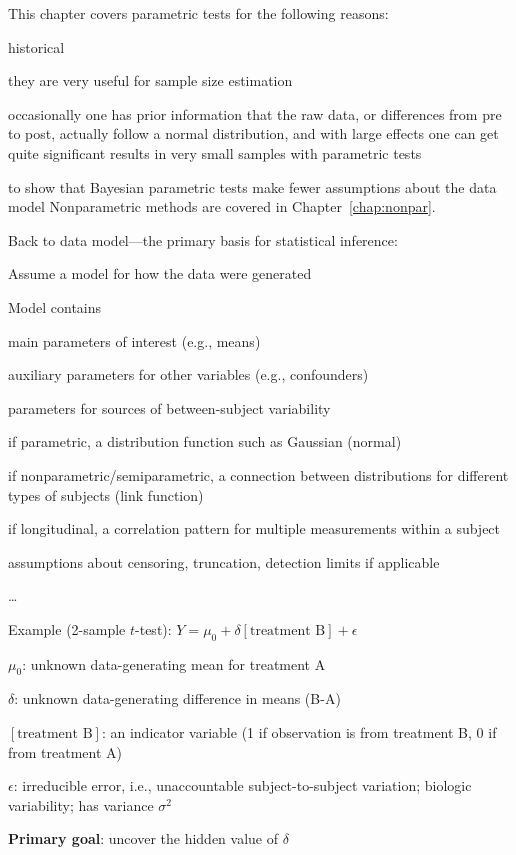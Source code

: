 This chapter covers parametric tests for the following reasons:
\be
\item historical
\item they are very useful for sample size estimation
\item occasionally one has prior information that the raw data, or
  differences from pre to post, actually follow a normal distribution,
  and with large effects one can get quite significant results in very
  small samples with parametric tests
\item to show that Bayesian parametric tests make fewer assumptions
  about the data model
\ee
Nonparametric methods are covered in Chapter~\ref{chap:nonpar}. 

Back to data model---the primary basis for statistical inference:
\bi
\item Assume a model for how the data were generated
\item Model contains
  \bi
  \item main parameters of interest (e.g., means)
  \item auxiliary parameters for other variables (e.g., confounders)
  \item parameters for sources of between-subject variability
  \item if parametric, a distribution function such as Gaussian (normal)
  \item if nonparametric/semiparametric, a connection between
    distributions for different types of subjects (link function)
  \item if longitudinal, a correlation pattern for multiple
    measurements within a subject
  \item assumptions about censoring, truncation, detection limits if applicable
  \item \ldots
  \ei
\item Example (2-sample $t$-test): $Y = \mu_{0} + \delta
  [\textrm{treatment B}] + \epsilon$
  \bi
  \item $\mu_{0}$: unknown data-generating mean for treatment A
  \item $\delta$: unknown data-generating difference in means (B-A)
  \item $[\textrm{treatment B}]$: an indicator variable (1 if
    observation is from treatment B, 0 if from treatment A)
  \item $\epsilon$: irreducible error, i.e., unaccountable
    subject-to-subject variation; biologic variability; has variance $\sigma^2$
  \item \textbf{Primary goal}: uncover the hidden value of $\delta$
